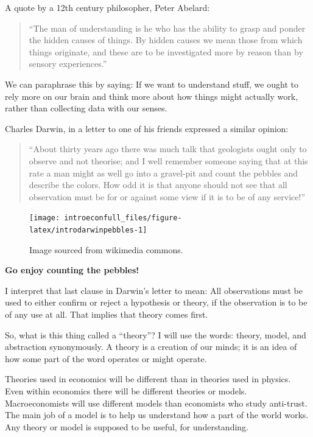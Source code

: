 \documentclass[
]{book}
\begin{document}
A quote by a 12th century philosopher, Peter Abelard:

\begin{quote}
``The man of understanding is he who has the ability to grasp and ponder the hidden causes of things. By hidden causes we mean those from which things originate, and these are to be investigated more by reason than by sensory experiences.''
\end{quote}

We can paraphrase this by saying: If we want to understand stuff, we ought to rely more on our brain and think more about how things might actually work, rather than collecting data with our senses.

Charles Darwin, in a letter to one of his friends expressed a similar opinion:

\begin{quote}
``About thirty years ago there was much talk that geologists ought only to observe and not theorise; and I well remember someone saying that at this rate a man might as well go into a gravel-pit and count the pebbles and describe the colors. How odd it is that anyone should not see that all observation must be for or against some view if it is to be of any service!''
\end{quote}

\begin{figure}

{\centering \texttt{[image: introeconfull\_files/figure-latex/introdarwinpebbles-1]} 

}

\caption{Image sourced from wikimedia commons.}\label{fig:introdarwinpebbles}
\end{figure}

\begin{center}
\textbf{Go enjoy counting the pebbles!}

\end{center}

I interpret that last clause in Darwin's letter to mean: All observations must be used to either confirm or reject a hypothesis or theory, if the observation is to be of any use at all. That implies that theory comes first.

So, what is this thing called a ``theory''? I will use the words: theory, model, and abstraction synonymously. A theory is a creation of our minds; it is an idea of how some part of the word operates or might operate.

Theories used in economics will be different than in theories used in physics. Even within economics there will be different theories or models. Macroeconomists will use different models than economists who study anti-trust. The main job of a model is to help us understand how a part of the world works. Any theory or model is supposed to be useful, for understanding.
\end{document}
